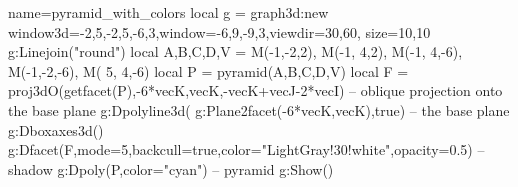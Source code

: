 \documentclass[10pt]{standalone}%
\begin{document}
\begin{luadraw}{name=pyramid_with_colors}
local g = graph3d:new{ window3d={-2,5,-2,5,-6,3},window={-6,9,-9,3},viewdir={30,60}, size={10,10}}
g:Linejoin("round")
local A,B,C,D,V = M(-1,-2,2), M(-1, 4,2), M(-1, 4,-6), M(-1,-2,-6), M( 5, 4,-6)
local P = pyramid({A,B,C,D},V)
local F = proj3dO(getfacet(P),{-6*vecK,vecK},-vecK+vecJ-2*vecI) -- oblique projection onto the base plane
g:Dpolyline3d( g:Plane2facet({-6*vecK,vecK}),true) -- the base plane
g:Dboxaxes3d()
g:Dfacet(F,{mode=5,backcull=true,color="LightGray!30!white",opacity=0.5}) -- shadow
g:Dpoly(P,{color="cyan"}) -- pyramid
g:Show() 
\end{luadraw}
\end{document}
